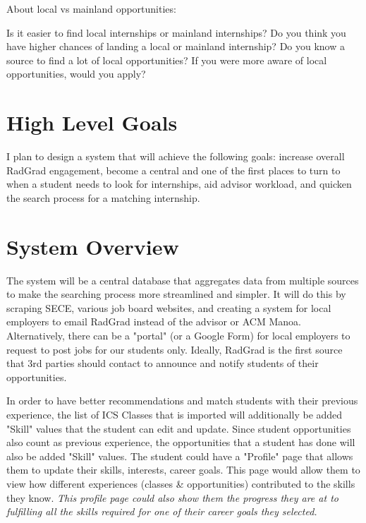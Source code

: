 \documentclass[english]{proposalnsf}
\begin{document}
About local vs mainland opportunities:
\begin{outline}
    \1 Is it easier to find local internships or mainland internships?
    \1 Do you think you have higher chances of landing a local or mainland internship?
    \1 Do you know a source to find a lot of local opportunities?
    \1 If you were more aware of local opportunities, would you apply?
\end{outline}

	\section{High Level Goals}
	\label{Goals}
	I plan to design a system that will achieve the following goals: increase overall RadGrad engagement, become a central and one of the first places to turn to when a student needs to look for internships, aid advisor workload, and quicken the search process for a matching internship. 

	
	\section{System Overview}
	\label{overview}

The system will be a central database that aggregates data from multiple sources to make the searching process more streamlined and simpler. It will do this by scraping SECE, various job board websites, and creating a system for local employers to email RadGrad instead of the advisor or ACM Manoa. Alternatively, there can be a "portal" (or a Google Form) for local employers to request to post jobs for our students only. Ideally, RadGrad is the first source that 3rd parties should contact to announce and notify students of their opportunities. 

In order to have better recommendations and match students with their previous experience, the list of ICS Classes that is imported will additionally be added "Skill" values that the student can edit and update. Since student opportunities also count as previous experience, the opportunities that a student has done will also be added "Skill" values. The student could have a "Profile" page that allows them to update their skills, interests, career goals. This page would allow them to view how different experiences (classes \& opportunities) contributed to the skills they know. \textit{This profile page could also show them the progress they are at to fulfilling all the skills required for one of their career goals they selected.}
\end{document}
